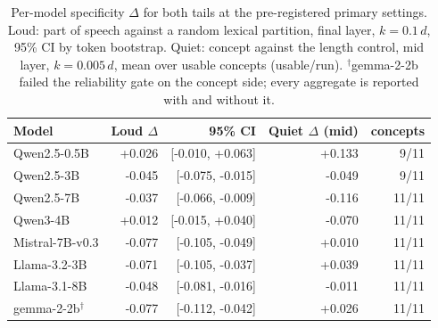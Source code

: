 \begin{table}[t]
\centering\small
\begin{tabular}{lrrrr}
\toprule
Model & Loud $\Delta$ & 95\% CI & Quiet $\Delta$ (mid) & concepts \\
\midrule
Qwen2.5-0.5B & +0.026 & [-0.010, +0.063] & +0.133 & 9/11 \\
Qwen2.5-3B & -0.045 & [-0.075, -0.015] & -0.049 & 9/11 \\
Qwen2.5-7B & -0.037 & [-0.066, -0.009] & -0.116 & 11/11 \\
Qwen3-4B & +0.012 & [-0.015, +0.040] & -0.070 & 11/11 \\
Mistral-7B-v0.3 & -0.077 & [-0.105, -0.049] & +0.010 & 11/11 \\
Llama-3.2-3B & -0.071 & [-0.105, -0.037] & +0.039 & 11/11 \\
Llama-3.1-8B & -0.048 & [-0.081, -0.016] & -0.011 & 11/11 \\
gemma-2-2b$^\dagger$ & -0.077 & [-0.112, -0.042] & +0.026 & 11/11 \\
\bottomrule
\end{tabular}
\caption{Per-model specificity $\Delta$ for both tails at the pre-registered primary settings. Loud: part of speech against a random lexical partition, final layer, $k=0.1\,d$, 95\% CI by token bootstrap. Quiet: concept against the length control, mid layer, $k=0.005\,d$, mean over usable concepts (usable/run). $^\dagger$gemma-2-2b failed the reliability gate on the concept side; every aggregate is reported with and without it.}
\label{tab:two_tail}
\end{table}
